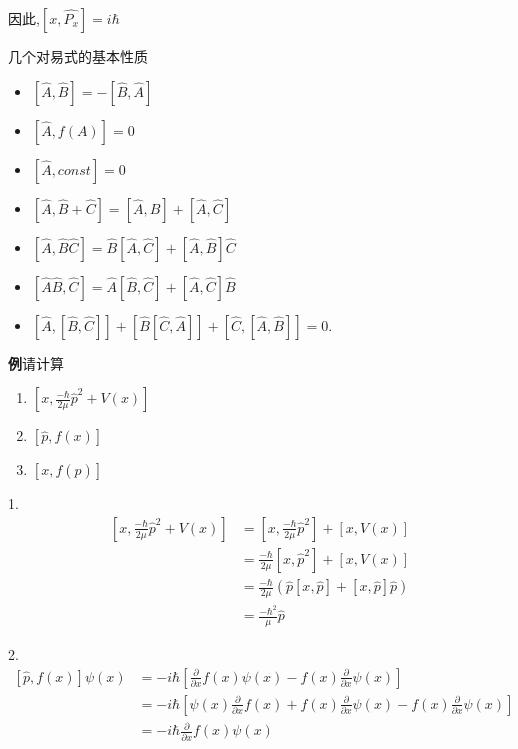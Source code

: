 \documentclass[lang=cn,15pt]{elegantbook}
\begin{document}
因此,$[x,\hat{P_x}]=i\hbar$

几个对易式的基本性质
\begin{itemize}
	\item $[ \hat{A} ,\hat{B} ]=- [ \hat{B} ,\hat{A} ]$
	\item $[\hat{A},f(A)]=0$
	\item $[\hat{A},const]=0$
	\item $[\hat{A},\hat{B}+\hat{C}]=[\hat{A},\hat{B}]+[\hat{A},\hat{C}]$
	\item $[ \hat{A} ,\hat{B}\hat{C} ]=\hat{B}[ \hat{A} ,\hat{C} ]+[ \hat{A} ,\hat{B} ] \hat{C} $
	\item $[\hat{A}\hat{B},\hat{C}]=\hat{A}[\hat{B},\hat{C}]+[\hat{A},\hat{C}]\hat{B}$
	\item $[\hat{A},[\hat{B},\hat{C}]]+[\hat{B}[\hat{C},\hat{A}]]+[\hat{C},[\hat{A},\hat{B}]]=0.$
\end{itemize}

\textbf{例}请计算
\begin{enumerate}
	\item $[x,\frac{-\hbar}{2\mu}\hat{p}^{2}+V(x)]$
	\item $[\hat{p},f(x)]$
	\item $[x,f(\hat{p})]$
\end{enumerate}

1.\begin{equation*}
	\begin{split}
		[x,\frac{-\hbar}{2\mu}\hat{p}^2+V(x)]&=[x,\frac{-\hbar}{2\mu}\hat{p}^2]+[x,V(x)]
		\\
		&=\frac{-\hbar}{2\mu}[x,\hat{p}^2]+[x,V(x)]
		\\
		&=\frac{-\hbar}{2\mu}\left( \hat{p}[x,\hat{p}]+[x,\hat{p}]\hat{p} \right) 
		\\
		&=\frac{-\hbar ^2}{\mu}\hat{p}
	\end{split}
\end{equation*}

2.\begin{equation*}
	\begin{split}
		[\hat{p},f(x)]\psi \left( x \right) &=-i\hbar \left[ \frac{\partial}{\partial x}f\left( x \right) \psi \left( x \right) -f\left( x \right) \frac{\partial}{\partial x}\psi \left( x \right) \right] 
		\\
		&=-i\hbar \left[ \psi \left( x \right) \frac{\partial}{\partial x}f\left( x \right) +f\left( x \right) \frac{\partial}{\partial x}\psi \left( x \right) -f\left( x \right) \frac{\partial}{\partial x}\psi \left( x \right) \right] 
		\\
		&=-i\hbar \frac{\partial}{\partial x}f\left( x \right) \psi \left( x \right)
	\end{split}
\end{equation*}
\end{document}
